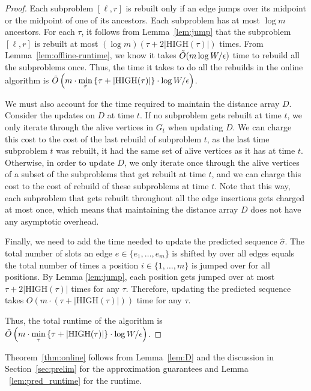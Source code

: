 \begin{proof}
    Each subproblem $[\ell,r]$ is rebuilt only if an edge jumps over its midpoint or the midpoint of one of its ancestors.
    Each subproblem has at most $\log m$ ancestors. 
    For each $\tau$, it follows from Lemma~\ref{lem:jump} that the subproblem $[\ell,r]$ is rebuilt at most $(\log m)(\tau + 2|\text{HIGH}(\tau)|)$ times.
    From Lemma~\ref{lem:offline-runtime}, we know it takes $\Tilde{O}(m \log W/ \epsilon)$ time to rebuild all the subproblems once. 
    Thus, the time it takes to do all the rebuilds in the online algorithm is
    $\Tilde{O}\left(m \cdot \min\limits_{\tau} \left\{\tau + |\text{HIGH}(\tau)|\right\}\cdot \log W / \epsilon \right)$.
    
    We must also account for the time required to maintain the distance array $D$.  
    Consider the updates on $D$ at time $t$. 
    If no subproblem gets rebuilt at time $t$, we only iterate through the alive vertices in $G_t$ when updating $D$. We can charge this cost to the cost of the last rebuild of subproblem $t$, as the last time subproblem $t$ was rebuilt, it had the same set of alive vertices as it has at time $t$. 
    Otherwise, in order to update $D$, we only iterate once through the alive vertices of a subset of the subproblems that get rebuilt at time $t$, and we can charge this cost to the cost of rebuild of these subproblems at time $t$. Note that this way, each subproblem that gets rebuilt throughout all the edge insertions gets charged at most once, which means that maintaining the distance array $D$ does not have any asymptotic overhead.
    
    Finally, we need to add the time needed to update the predicted sequence $\hat{\sigma}$. The total number of slots an edge $e \in \{e_1, \ldots, e_m\}$ is shifted by over all edges equals the total number of times a position $i \in \{1, \ldots, m\}$ is jumped over for all positions.  By Lemma \ref{lem:jump}, each position gets jumped over at most $\tau + 2|\text{HIGH}(\tau)|$ times for any $\tau$. Therefore, updating the predicted sequence takes $O(m \cdot (\tau + |\text{HIGH}(\tau)|))$ time for any $\tau$.
        
    Thus, the total runtime of the algorithm is $\Tilde{O}\left(m \cdot \min\limits_{\tau} \left\{\tau + |\text{HIGH}(\tau)|\right\}\cdot \log W / \epsilon \right)$.
\end{proof}

Theorem~\ref{thm:online} follows from  Lemma~\ref{lem:D} and the discussion in Section~\ref{sec:prelim} for the approximation guarantees and Lemma ~\ref{lem:pred_runtime} for the runtime.